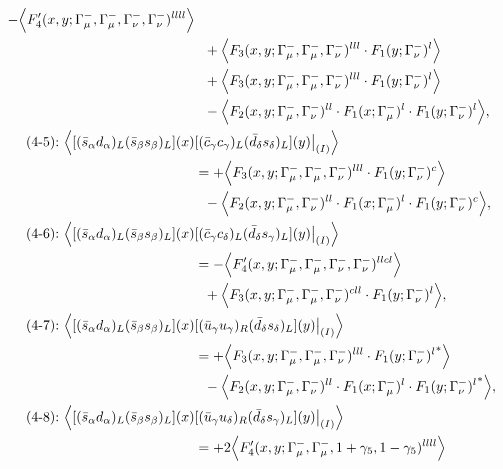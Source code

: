 \begin{align}
 - \Big\langle F_4'(x,y;\Gamma_\mu^-,\Gamma_\mu^-,\Gamma_\nu^-,\Gamma_\nu^-)^{llll}\Big\rangle
\notag\\*&\ \ 
 + \Big\langle F_3(x,y;\Gamma_\mu^-,\Gamma_\mu^-,\Gamma_\nu^-)^{lll} \cdot F_1(y;\Gamma_\nu^-)^l\Big\rangle
\notag\\*&\ \ 
 + \Big\langle F_3(x,y;\Gamma_\mu^-,\Gamma_\mu^-,\Gamma_\nu^-)^{lll} \cdot F_1(y;\Gamma_\nu^-)^l\Big\rangle
\notag\\*&\ \ 
 - \Big\langle F_2(x,y;\Gamma_\mu^-,\Gamma_\nu^-)^{ll} \cdot F_1(x;\Gamma_\mu^-)^l \cdot F_1(y;\Gamma_\nu^-)^l\Big\rangle,
\\
\mbox{(4-5):}\ 
\Big\langle
[(\bar s_\alpha d_\alpha)_L(\bar s_\beta s_\beta)_L](x)&
[(\bar c_\gamma c_\gamma)_L(\bar d_\delta s_\delta)_L](y)\big|_{(I)}
\Big\rangle
\notag\\*
&=
 + \Big\langle F_3(x,y;\Gamma_\mu^-,\Gamma_\mu^-,\Gamma_\nu^-)^{lll} \cdot F_1(y;\Gamma_\nu^-)^c\Big\rangle
\notag\\*&\ \ 
 - \Big\langle F_2(x,y;\Gamma_\mu^-,\Gamma_\nu^-)^{ll} \cdot F_1(x;\Gamma_\mu^-)^l \cdot F_1(y;\Gamma_\nu^-)^c\Big\rangle,
\\
\mbox{(4-6):}\ 
\Big\langle
[(\bar s_\alpha d_\alpha)_L(\bar s_\beta s_\beta)_L](x)&
[(\bar c_\gamma c_\delta)_L(\bar d_\delta s_\gamma)_L](y)\big|_{(I)}
\Big\rangle
\notag\\*
&=
 - \Big\langle F_4'(x,y;\Gamma_\mu^-,\Gamma_\mu^-,\Gamma_\nu^-,\Gamma_\nu^-)^{llcl}\Big\rangle
\notag\\*&\ \ 
 + \Big\langle F_3(x,y;\Gamma_\mu^-,\Gamma_\mu^-,\Gamma_\nu^-)^{cll} \cdot F_1(y;\Gamma_\nu^-)^l\Big\rangle,
\\
\mbox{(4-7):}\ 
\Big\langle
[(\bar s_\alpha d_\alpha)_L(\bar s_\beta s_\beta)_L](x)&
[(\bar u_\gamma u_\gamma)_R(\bar d_\delta s_\delta)_L](y)\big|_{(I)}
\Big\rangle
\notag\\*
&=
 + \Big\langle F_3(x,y;\Gamma_\mu^-,\Gamma_\mu^-,\Gamma_\nu^-)^{lll} \cdot {F_1(y;\Gamma_\nu^-)^l}^*\Big\rangle
\notag\\*&\ \ 
 - \Big\langle F_2(x,y;\Gamma_\mu^-,\Gamma_\nu^-)^{ll} \cdot F_1(x;\Gamma_\mu^-)^l \cdot {F_1(y;\Gamma_\nu^-)^l}^*\Big\rangle,
\\
\mbox{(4-8):}\ 
\Big\langle
[(\bar s_\alpha d_\alpha)_L(\bar s_\beta s_\beta)_L](x)&
[(\bar u_\gamma u_\delta)_R(\bar d_\delta s_\gamma)_L](y)\big|_{(I)}
\Big\rangle
\notag\\*
&=
 + 2\Big\langle F_4'(x,y;\Gamma_\mu^-,\Gamma_\mu^-,1+\gamma_5,1-\gamma_5)^{llll}\Big\rangle
\notag\\*&\ \ 

\end{align}
